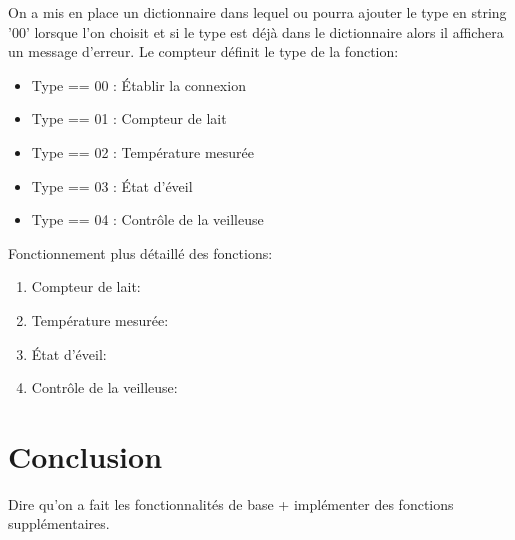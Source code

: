 \documentclass [11pt]{article}
\begin{document}
\noindent On a mis en place un dictionnaire dans lequel ou pourra ajouter le type en string '00' lorsque l'on choisit et si le type est déjà dans le dictionnaire alors il affichera un message d'erreur. Le compteur définit le type de la fonction\string:
\begin{itemize}
    \item[\textbullet]  Type == 00 : Établir la connexion
    \item[\textbullet] Type == 01 : Compteur de lait
    \item[\textbullet] Type == 02 : Température mesurée
    \item[\textbullet] Type == 03 : État d'éveil
    \item[\textbullet] Type == 04 : Contrôle de la veilleuse
\end{itemize}

\noindent Fonctionnement plus détaillé des fonctions:
\begin{enumerate}
    \item Compteur de lait\string:
    \item Température mesurée\string:
    \item État d'éveil\string:
    \item Contrôle de la veilleuse\string:
\end{enumerate}
\section{Conclusion}
Dire qu'on a fait les fonctionnalités de base + implémenter des fonctions supplémentaires.
\end{document}
